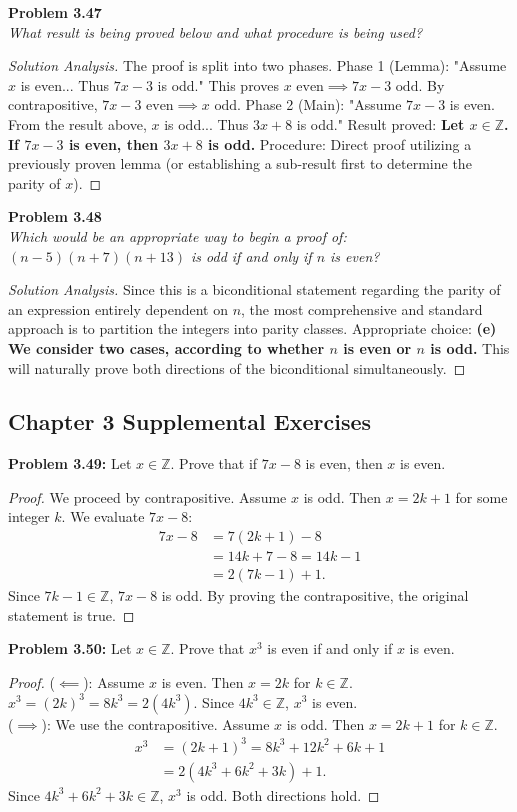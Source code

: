 \documentclass[11pt, letterpaper]{article}
\theoremstyle{definition}
\theoremstyle{remark}
\newcommand{\Z}{\mathbb{Z}}
\begin{document}
\textbf{Problem 3.47} \\
\textit{What result is being proved below and what procedure is being used?}
\begin{proof}[Solution Analysis]
The proof is split into two phases. 
Phase 1 (Lemma): "Assume $x$ is even... Thus $7x-3$ is odd." This proves $x \text{ even} \implies 7x-3 \text{ odd}$. By contrapositive, $7x-3 \text{ even} \implies x \text{ odd}$.
Phase 2 (Main): "Assume $7x-3$ is even. From the result above, $x$ is odd... Thus $3x+8$ is odd."
Result proved: \textbf{Let $x \in \Z$. If $7x-3$ is even, then $3x+8$ is odd.} 
Procedure: Direct proof utilizing a previously proven lemma (or establishing a sub-result first to determine the parity of $x$).
\end{proof}

\textbf{Problem 3.48} \\
\textit{Which would be an appropriate way to begin a proof of: $(n-5)(n+7)(n+13)$ is odd if and only if $n$ is even?}
\begin{proof}[Solution Analysis]
Since this is a biconditional statement regarding the parity of an expression entirely dependent on $n$, the most comprehensive and standard approach is to partition the integers into parity classes. 
Appropriate choice: \textbf{(e) We consider two cases, according to whether $n$ is even or $n$ is odd.} This will naturally prove both directions of the biconditional simultaneously.
\end{proof}

\subsection{Chapter 3 Supplemental Exercises}

\textbf{Problem 3.49:} Let $x \in \Z$. Prove that if $7x-8$ is even, then $x$ is even.
\begin{proof}
We proceed by contrapositive. Assume $x$ is odd. Then $x = 2k + 1$ for some integer $k$. We evaluate $7x - 8$:
\begin{align*}
    7x - 8 &= 7(2k + 1) - 8 \\
           &= 14k + 7 - 8 = 14k - 1 \\
           &= 2(7k - 1) + 1.
\end{align*}
Since $7k - 1 \in \Z$, $7x - 8$ is odd. By proving the contrapositive, the original statement is true.
\end{proof}

\textbf{Problem 3.50:} Let $x \in \Z$. Prove that $x^3$ is even if and only if $x$ is even.
\begin{proof}
($\impliedby$): Assume $x$ is even. Then $x = 2k$ for $k \in \Z$. $x^3 = (2k)^3 = 8k^3 = 2(4k^3)$. Since $4k^3 \in \Z$, $x^3$ is even. \\
($\implies$): We use the contrapositive. Assume $x$ is odd. Then $x = 2k+1$ for $k \in \Z$. 
\begin{align*}
    x^3 &= (2k+1)^3 = 8k^3 + 12k^2 + 6k + 1 \\
        &= 2(4k^3 + 6k^2 + 3k) + 1.
\end{align*}
Since $4k^3 + 6k^2 + 3k \in \Z$, $x^3$ is odd. Both directions hold.
\end{proof}
\end{document}
